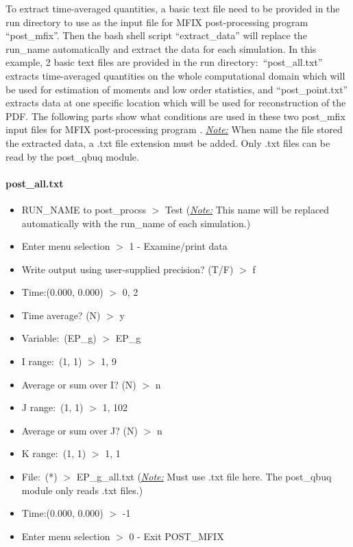 \documentclass[a4paper,12pt,titlepage]{article}
\begin{document}
To extract time-averaged quantities, a basic text file need to be provided in 
the run directory to use as the input file for MFIX post-processing program
``post\_mfix''. Then the bash shell script ``extract\_data'' will replace the 
run\_name automatically and extract the data for each simulation. In this
example, 2 basic text files are provided in the run directory:\ 
``post\_all.txt'' extracts time-averaged quantities on the whole computational
domain which will be used for estimation of moments and low order statistics, 
and ``post\_point.txt'' extracts data at one specific location which will be 
used for reconstruction of the PDF. The following parts show what conditions are 
used in these two post\_mfix input files for MFIX post-processing program . 
\emph{\underline{Note:}} When name the file stored the extracted data, a .txt 
file extension must be added. Only .txt files can be read by the post\_qbuq 
module.

\paragraph*{post\_all.txt}

\begin{itemize}
 \item RUN\_NAME to post\_procss $>$ Test (\emph{\underline{Note:}} This name 
 will be replaced automatically with the run\_name of each simulation.)
 \item Enter menu selection $>$ 1 - Examine/print data
 \item Write output using user-supplied precision? (T/F) $>$ f
 \item Time:(0.000, 0.000) $>$ 0, 2
 \item Time average? (N) $>$ y
 \item Variable:\ (EP\_g) $>$ EP\_g
 \item I range:\ (1, 1) $>$ 1, 9
 \item Average or sum over I? (N) $>$ n
 \item J range:\ (1, 1) $>$ 1, 102
 \item Average or sum over J? (N)  $>$ n
 \item K range:\ (1, 1) $>$ 1, 1
 \item File:\ (*) $>$ EP\_g\_all.txt (\emph{\underline{Note:}} Must use .txt 
 file here. The post\_qbuq module only reads .txt files.)
 \item Time:(0.000, 0.000) $>$ -1
 \item Enter menu selection $>$ 0 - Exit POST\_MFIX
\end{itemize}
\end{document}
